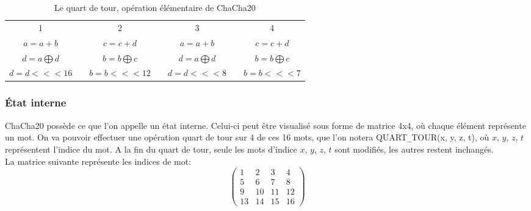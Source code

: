 \begin{table}[H]
    \centering
    \begin{tabular}{ccccccc}
        1 && 2 && 3 && 4 \\
        $a=a+b$ && $c=c+d$ && $a=a+b$ && $c=c+d$ \\
        $d=a \bigoplus d$ && $b=b \bigoplus c$ && $d=a \bigoplus d$ && $b=b \bigoplus c$ \\
         $d=d<<<16$ && $b=b<<<12$ && $d=d<<<8$ && $b=b<<<7$ \\
    \end{tabular}
    \caption{Le quart de tour, opération élémentaire de ChaCha20 \cite{nir_chacha20_2015}}
    \label{tab:my_label}
\end{table}

\subsubsection{État interne}
ChaCha20 possède ce que l'on appelle un état interne. Celui-ci peut être visualisé sous forme de matrice 4x4, où chaque élément représente un mot. On va pouvoir effectuer une opération quart de tour sur 4 de ces 16 mots, que l'on notera {\ttfamily QUART\verb|_|TOUR(x, y, z, t)}, où $x$, $y$, $z$, $t$ représentent l'indice du mot. A la fin du quart de tour, seule les mots d'indice $x$, $y$, $z$, $t$ sont modifiés, les autres restent inchangés. \cite{nir_chacha20_2015} \\
La matrice suivante représente les indices de mot:
\[ \left(
\begin{array}{cccc}
1 & 2 & 3 & 4 \\
5 & 6 & 7 & 8 \\
9 & 10 & 11 & 12 \\
13 & 14 & 15 & 16
\end{array} \right) \] \label{indices}

